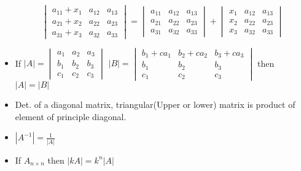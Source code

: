 \documentclass[12pt]{article}
\begin{document}
\begin{itemize}
\[\begin{vmatrix}
		a_{11}+x_1 & a_{12} & a_{13} \\
		a_{21}+x_2 & a_{22} & a_{23} \\
		a_{31}+x_3 & a_{32} & a_{33} 
		\end{vmatrix}
		=
			\begin{vmatrix}
		a_{11} & a_{12} & a_{13} \\
		a_{21} & a_{22} & a_{23} \\
		a_{31} & a_{32} & a_{33} 
		\end{vmatrix}
		+
		\begin{vmatrix}
		x_1 & a_{12} & a_{13} \\
		x_2 & a_{22} & a_{23} \\
		x_3 & a_{32} & a_{33} 
		\end{vmatrix}	
	\]
	\item If $ |A| = \begin{vmatrix}
	a_{1} & a_{2} & a_{3} \\
	b_{1} & b_{2} & b_{3} \\
	c_{1} & c_{2} & c_{3} 
	\end{vmatrix}  $ $ |B| = \begin{vmatrix}
	b_1+ca_{1} & b_2+ca_{2} & b_3+ca_{3} \\
	b_{1} & b_{2} & b_{3} \\
	c_{1} & c_{2} & c_{3} 
	\end{vmatrix}  $ then $|A| = |B|$
	\item Det. of a diagonal matrix, triangular(Upper or lower) matrix is product of element of principle diagonal.
	\item $|A^{-1}| = \frac{1}{|A|}$
	\item If $A_{n\times n}$ then $|kA| = k^n|A|$
\end{itemize}
\end{document}
